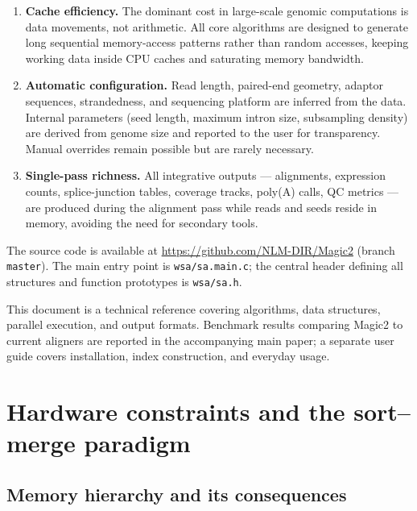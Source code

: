 \documentclass[11pt]{article}
\begin{document}
\begin{enumerate}
\item \textbf{Cache efficiency.}
      The dominant cost in large-scale genomic computations is data
      movements, not arithmetic.
      All core algorithms are designed to generate long sequential
      memory-access patterns rather than random accesses, keeping
      working data inside CPU caches and saturating memory bandwidth.

\item \textbf{Automatic configuration.}
      Read length, paired-end geometry, adaptor sequences, strandedness,
      and sequencing platform are inferred from the data.
      Internal parameters (seed length, maximum intron size, subsampling
      density) are derived from genome size and reported to the user for
      transparency.
      Manual overrides remain possible but are rarely necessary.

\item \textbf{Single-pass richness.}
      All integrative outputs --- alignments, expression counts,
      splice-junction tables, coverage tracks, poly(A) calls, QC
      metrics --- are produced during the alignment pass while reads and
      seeds reside in memory, avoiding the need for secondary tools.
\end{enumerate}

The source code is available at
\url{https://github.com/NLM-DIR/Magic2} (branch \texttt{master}).
The main entry point is \texttt{wsa/sa.main.c}; the central header
defining all structures and function prototypes is \texttt{wsa/sa.h}.

This document is a technical reference covering algorithms, data
structures, parallel execution, and output formats.
Benchmark results comparing Magic2 to current aligners are reported
in the accompanying main paper; a separate user guide covers
installation, index construction, and everyday usage.

\section{Hardware constraints and the sort--merge paradigm}
\label{sec:hardware}

\subsection{Memory hierarchy and its consequences}
\label{sec:memory}
\end{document}
